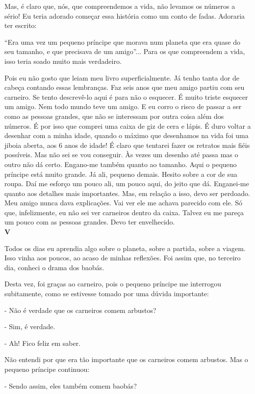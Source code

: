 \begin{Parallel}[p]{}{}
{Mas, é claro que, nós, que compreendemos a vida, não levamos os números
a sério! Eu teria adorado começar essa história como um conto de fadas.
Adoraria ter escrito:

``Era uma vez um pequeno príncipe que morava num planeta que era quase
do seu tamanho, e que precisava de um amigo''... Para os que compreendem
a vida, isso teria soado muito mais verdadeiro.

Pois eu não gosto que leiam meu livro superficialmente. Já tenho tanta
dor de cabeça contando essas lembranças. Faz seis anos que meu amigo
partiu com seu carneiro. Se tento descrevê-lo aqui é para não o
esquecer. É muito triste esquecer um amigo. Nem todo mundo teve um
amigo. E eu corro o risco de passar a ser como as pessoas grandes, que
não se interessam por outra coisa além dos números. É por isso que
comprei uma caixa de giz de cera e lápis. É duro voltar a desenhar com a
minha idade, quando o máximo que desenhamos na vida foi uma jiboia
aberta, aos 6 anos de idade! É claro que tentarei fazer os retratos mais
fiéis possíveis. Mas não sei se vou conseguir. Às vezes um desenho até
passa mas o outro não dá certo. Engano-me também quanto ao tamanho. Aqui
o pequeno príncipe está muito grande. Já ali, pequeno demais. Hesito
sobre a cor de sua roupa. Daí me esforço um pouco ali, um pouco aqui, do
jeito que dá. Enganei-me quanto aos detalhes mais importantes. Mas, em
relação a isso, devo ser perdoado. Meu amigo nunca dava explicações. Vai
ver ele me achava parecido com ele. Só que, infelizmente, eu não sei ver
carneiros dentro da caixa. Talvez eu me pareça um pouco com as pessoas
grandes. Devo ter envelhecido. \\

\textbf{V}

Todos os dias eu aprendia algo sobre o planeta, sobre a partida, sobre a
viagem. Isso vinha aos poucos, ao acaso de minhas reflexões. Foi assim
que, no terceiro dia, conheci o drama dos baobás.

Desta vez, foi graças ao carneiro, pois o pequeno príncipe me interrogou
subitamente, como se estivesse tomado por uma dúvida importante:

- Não é verdade que os carneiros comem arbustos?

- Sim, é verdade.

- Ah! Fico feliz em saber.

Não entendi por que era tão importante que os carneiros comem arbustos.
Mas o pequeno príncipe continuou:

- Sendo assim, eles também comem baobás?

}
\end{Parallel}
